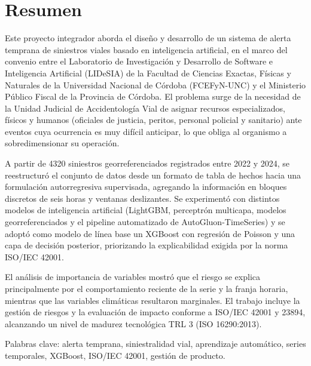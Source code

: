 \chapter*{Resumen}
Este proyecto integrador aborda el diseño y desarrollo de un sistema de alerta temprana de siniestros viales basado en inteligencia artificial, en el marco del convenio entre el Laboratorio de Investigación y Desarrollo de Software e Inteligencia Artificial (LIDeSIA) de la Facultad de Ciencias Exactas, Físicas y Naturales de la Universidad Nacional de Córdoba (FCEFyN-UNC) y el Ministerio Público Fiscal de la Provincia de Córdoba. El problema surge de la necesidad de la Unidad Judicial de Accidentología Vial de asignar recursos especializados, físicos y humanos (oficiales de justicia, peritos, personal policial y sanitario) ante eventos cuya ocurrencia es muy difícil anticipar, lo que obliga al organismo a sobredimensionar su operación.

A partir de 4320 siniestros georreferenciados registrados entre 2022 y 2024, se reestructuró el conjunto de datos desde un formato de tabla de hechos hacia una formulación autorregresiva supervisada, agregando la información en bloques discretos de seis horas y ventanas deslizantes. Se experimentó con distintos modelos de inteligencia artificial (LightGBM, perceptrón multicapa, modelos georreferenciados y el pipeline automatizado de AutoGluon-TimeSeries) y se adoptó como modelo de línea base un XGBoost con regresión de Poisson y una capa de decisión posterior, priorizando la explicabilidad exigida por la norma ISO/IEC 42001.

El análisis de importancia de variables mostró que el riesgo se explica principalmente por el comportamiento reciente de la serie y la franja horaria, mientras que las variables climáticas resultaron marginales. El trabajo incluye la gestión de riesgos y la evaluación de impacto conforme a ISO/IEC 42001 y 23894, alcanzando un nivel de madurez tecnológica TRL 3 (ISO 16290:2013).

Palabras clave: alerta temprana, siniestralidad vial, aprendizaje automático, series temporales, XGBoost, ISO/IEC 42001, gestión de producto.



